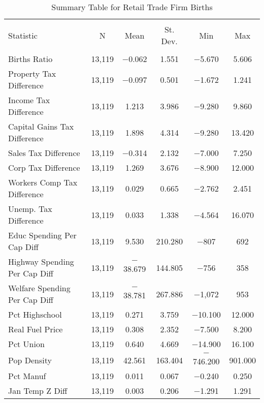 
\begin{table}[!htbp] \centering 
  \caption{Summary Table for  Retail Trade Firm Births} 
  \label{44-45summary} 
\begin{tabular}{@{\extracolsep{5pt}}lccccc} 
\\[-1.8ex]\hline 
\hline \\[-1.8ex] 
Statistic & \multicolumn{1}{c}{N} & \multicolumn{1}{c}{Mean} & \multicolumn{1}{c}{St. Dev.} & \multicolumn{1}{c}{Min} & \multicolumn{1}{c}{Max} \\ 
\hline \\[-1.8ex] 
Births Ratio & 13,119 & $-$0.062 & 1.551 & $-$5.670 & 5.606 \\ 
Property Tax Difference & 13,119 & $-$0.097 & 0.501 & $-$1.672 & 1.241 \\ 
Income Tax Difference & 13,119 & 1.213 & 3.986 & $-$9.280 & 9.860 \\ 
Capital Gains Tax Difference & 13,119 & 1.898 & 4.314 & $-$9.280 & 13.420 \\ 
Sales Tax Difference & 13,119 & $-$0.314 & 2.132 & $-$7.000 & 7.250 \\ 
Corp Tax Difference & 13,119 & 1.269 & 3.676 & $-$8.900 & 12.000 \\ 
Workers Comp Tax Difference & 13,119 & 0.029 & 0.665 & $-$2.762 & 2.451 \\ 
Unemp. Tax Difference & 13,119 & 0.033 & 1.338 & $-$4.564 & 16.070 \\ 
Educ Spending Per Cap Diff & 13,119 & 9.530 & 210.280 & $-$807 & 692 \\ 
Highway Spending Per Cap Diff & 13,119 & $-$38.679 & 144.805 & $-$756 & 358 \\ 
Welfare Spending Per Cap Diff & 13,119 & $-$38.781 & 267.886 & $-$1,072 & 953 \\ 
Pct Highschool & 13,119 & 0.271 & 3.759 & $-$10.100 & 12.000 \\ 
Real Fuel Price & 13,119 & 0.308 & 2.352 & $-$7.500 & 8.200 \\ 
Pct Union & 13,119 & 0.640 & 4.669 & $-$14.900 & 16.100 \\ 
Pop Density & 13,119 & 42.561 & 163.404 & $-$746.200 & 901.000 \\ 
Pct Manuf & 13,119 & 0.011 & 0.067 & $-$0.240 & 0.250 \\ 
Jan Temp Z Diff & 13,119 & 0.003 & 0.206 & $-$1.291 & 1.291 \\ 

\end{tabular}
\end{table}
